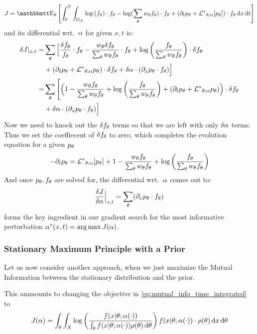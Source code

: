 \documentclass{article}
\begin{document}
$$
J =  \Exp_\th
\left[ \int_0^T\int_{\O_X} \log\left(f_\th\right)\cdot \ft - 
\log(\sum_\th \wt \ft) \cdot f_\th 
 			 + 
 			 (\di_t p_\th + \Lstar_{\th;\a} [p_\th] ) \cdot f_\th
\intd{x}
\intd{t} \right]
$$
and its differential wrt.\ ${\alpha}$ for given $x,t$ is:
\begin{align*}
\delta J|_{x,t} =& \sum_{\theta} \Big[
\frac{{ \delta f_{\theta}}}{{ f_{\theta}}} \cdot { f_{\theta}} - \frac{  w_{\theta} { \delta f_{\theta}} }{\sum_{\theta} w_{\theta}{ f_{\theta}}}\cdot { f_{\theta}} 
+ \log\left(\frac{f_{\theta}} {\sum_{\theta} { w_{\theta} } { f_{\theta}} }\right) \cdot { \delta f_{\theta}}  
\\&
+  ({\partial}_t p_{\theta} + { { \mathcal{L} }^* }_{{\theta};{\alpha}} p_{\theta} ) \cdot { \delta f_{\theta}}
+ \delta {\alpha} \cdot ({\partial}_x { p_{\theta}} \cdot { f_{\theta}})
\Big]
\\
=& \sum_{\theta} \Bigg[\Big(
1 - \frac{  w_{\theta} { f_{\theta}} }{\sum_{\theta} w_{\theta}{ f_{\theta}}} 
+ \log\left(\frac{f_{\theta}} {\sum_{\theta} { w_{\theta} } { f_{\theta}} }\right)   
+  ({\partial}_t p_{\theta} + { { \mathcal{L} }^* }_{{\theta};{\alpha}} p_{\theta} )
\Big)  \cdot { \delta f_{\theta}} 
\\
&+ \delta {\alpha} \cdot ({\partial}_x { p_{\theta}} \cdot { f_{\theta}})
\Big]
\end{align*}
Now we need to knock out the ${ \delta f_{\theta}}$ terms so that we are left with only $\delta
{\alpha}$ terms. Thus we set the coeffiecent of ${ \delta f_{\theta}}$ to zero, which completes the 
evolution equation for a given $p_{\theta}$
\begin{equation}
-{\partial}_t { p_{\theta}} = 
{ { \mathcal{L} }^* }_{{\theta};{\alpha}} [p_{\theta}] +  
1 - \frac{  w_{\theta} { f_{\theta}} }{\sum_{\theta} w_{\theta}{ f_{\theta}}} 
+ \log\left(\frac{f_{\theta}} {\sum_{\theta} { w_{\theta} } { f_{\theta}} }\right)   
\end{equation}
And once ${ p_{\theta}}, { f_{\theta}}$ are solved for, the differential wrt.\ ${\alpha}$ comes
out to:
\begin{equation}
\frac {\delta J}{\delta {\alpha}} \Big|_{x,t} = \sum_{\theta} ({\partial}_x { p_{\theta}} \cdot { f_{\theta}})
\label{eq:differential_objective_wrt_control_final}
\end{equation}
 forms the key ingredient
in our gradient search for the most informative perturbation $\a^*(x,t) =
\argmax J(\a)$.


\subsubsection{Stationary Maximum Principle with a Prior}
\label{sec:StatMP_with_a_prior}
Let us now consider another approach, when we just maximize the Mutual
Information between the stationary distribution and the prior.

This ammounts to changing the objective in
\cref{eq:mutual_info_time_integrated} to  
$$
J({\alpha})  = \int_{\theta} \int_X
 \log\left(\frac{f(x|{\theta} ; {\alpha}(\cdot) )}
 			{\int_{\theta} f(x|{\theta}; {\alpha}(\cdot)) \rho({\theta})\, \mathrm{d} {\theta}}\right) 
 f(x|{\theta}; {\alpha}(\cdot)) \cdot \rho({\theta}) \, \mathrm{d} x\, \mathrm{d} {\theta}
$$
\end{document}
